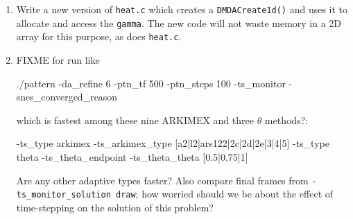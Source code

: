 \begin{enumerate}
\item \label{exer:ts:heatneumanndmda} Write a new version of \texttt{heat.c} which creates a \texttt{DMDACreate1d()} and uses it to allocate and access the \pVec \texttt{gamma}.  The new code will not waste memory in a 2D array for this purpose, as does \texttt{heat.c}.

\item FIXME for run like
\begin{cline}
./pattern -da_refine 6 -ptn_tf 500 -ptn_steps 100 -ts_monitor -snes_converged_reason
\end{cline}
which is fastest among these nine ARKIMEX and three $\theta$ methods?:
\begin{code}
-ts_type arkimex -ts_arkimex_type [a2|l2|ars122|2c|2d|2e|3|4|5]
-ts_type theta -ts_theta_endpoint -ts_theta_theta [0.5|0.75|1]
\end{code}
Are any other adaptive \pTS types faster?  Also compare final frames from \texttt{-ts\_monitor\_solution draw}; how worried should we be about the effect of time-stepping on the solution of this problem?

\end{enumerate}

